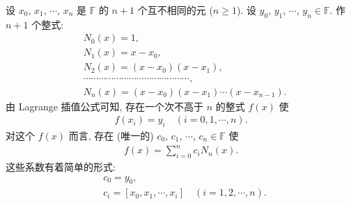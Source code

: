 \begin{proposition}
    设 $x_0$, $x_1$, $\cdots$, $x_{n}$ 是 $\mathbb{F}$ 的 $n+1$ 个互不相同的元 ($n \geq 1$). 设 $y_0$, $y_1$, $\cdots$, $y_{n} \in \mathbb{F}$. 作 $n+1$ 个整式:
    \begin{align*}
         & N_0 (x) = 1,                                          \\
         & N_1 (x) = x - x_0,                                    \\
         & N_2 (x) = (x - x_0) (x - x_1),                        \\
         & \cdots \cdots \cdots \cdots \cdots \cdots \cdots
        \cdots \cdots \cdots \cdots \cdots \cdots \cdots,        \\
         & N_{n} (x) = (x - x_0) (x - x_1) \cdots (x - x_{n-1}).
    \end{align*}
    由 Lagrange 插值公式可知, 存在一个次不高于 $n$ 的整式 $f(x)$ 使
    \begin{align*}
        f(x_i) = y_i \quad (i = 0,1,\cdots,n).
    \end{align*}
    对这个 $f(x)$ 而言, 存在 (唯一的) $c_0$, $c_1$, $\cdots$, $c_n \in \mathbb{F}$ 使
    \begin{align*}
        f(x) = \sum_{i = 0}^{n} c_i N_{n} (x).
    \end{align*}
    这些系数有着简单的形式:
    \begin{align*}
         & c_0 = y_0,                                              \\
         & c_i = [x_0, x_1, \cdots, x_i] \quad (i = 1,2,\cdots,n).
    \end{align*}
\end{proposition}


